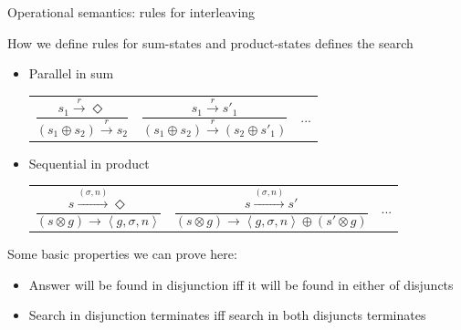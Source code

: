 \documentclass{beamer}
\let\\\tabularnewline
\let\\\tabularnewline
\newcommand{\inbr}[1]{\left<{#1}\right>}
\theoremstyle{definition}
\theoremstyle{plain} %
\begin{document}
\begin{frame}{Operational semantics: rules for interleaving}
    
How we define rules for sum-states and product-states defines the search

\begin{itemize}

\item Parallel in sum

\begin{tabular}{lll}

$\dfrac{s_1 \xrightarrow{r} \Diamond}{(s_1 \oplus s_2) \xrightarrow{r} s_2}$ &

$\dfrac{s_1 \xrightarrow{r} s'_1}{(s_1 \oplus s_2) \xrightarrow{r} (s_2 \oplus s'_1)}$ &

... \\

\end{tabular}

\vskip4mm

\item Sequential in product

\begin{tabular}{lll}

$\dfrac{s \xrightarrow{(\sigma, n)} \Diamond}{(s \otimes g) \xrightarrow{} \inbr{g, \sigma, n}} $ &

$\dfrac{s \xrightarrow{(\sigma, n)} s'}{(s \otimes g) \xrightarrow{} \inbr{g, \sigma, n} \oplus (s' \otimes g)}$ &

... \\

\end{tabular}

\end{itemize}

\vskip5mm

Some basic properties we can prove here:

\begin{itemize}
\item Answer will be found in disjunction iff it will be found in either of disjuncts
\item Search in disjunction terminates iff search in both disjuncts terminates
\end{itemize}

\end{frame}
\end{document}
